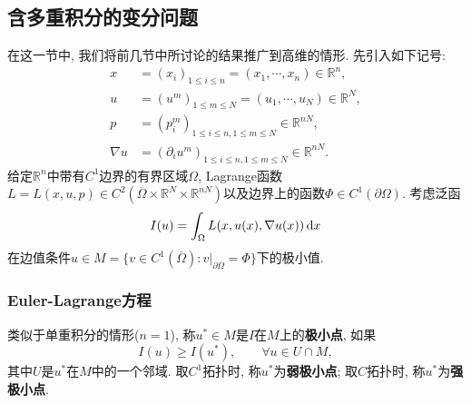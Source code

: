 \subsection{含多重积分的变分问题}

在这一节中, 我们将前几节中所讨论的结果推广到高维的情形. 先引入如下记号:
\begin{align*}
    x &= (x_i)_{1 \leq i \leq n} = (x_1, \cdots, x_n) \in \mathbb{R}^n, \\  
    u &= (u^m)_{1 \leq m \leq N} = (u_1, \cdots, u_N) \in \mathbb{R}^N, \\  
    p &= (p_i^m)_{1 \leq i \leq n, 1 \leq m \leq N} \in \mathbb{R}^{nN}, \\  
    \nabla u &= (\partial_iu^m)_{1 \leq i \leq n, 1 \leq m \leq N} \in \mathbb{R}^{nN}.
\end{align*}
给定$\mathbb{R}^n$中带有$C^1$边界的有界区域$\Omega$, Lagrange函数$L = L(x, u, p) \in C^2(\overline{\Omega} \times \mathbb{R}^N \times \mathbb{R}^{nN})$以及边界上的函数$\Phi \in C^1(\partial\Omega)$.
考虑泛函
\begin{equation*}
    I(u) = \int_{\Omega} L(x, u(x), \nabla u(x)) \,{\rm d}x
\end{equation*}
在边值条件$u \in M = \{v \in C^1(\overline{\Omega})\colon v|_{\partial\Omega} = \Phi\}$下的极小值.

\subsubsection{Euler-Lagrange方程}

类似于单重积分的情形($n = 1$), 称$u^* \in M$是$I$在$M$上的\textbf{极小点}, 如果 
\begin{equation*}
    I(u) \geq I(u^*), \qquad \forall u \in U \cap M,
\end{equation*}
其中$U$是$u^*$在$M$中的一个邻域. 取$C^1$拓扑时, 称$u^*$为\textbf{弱极小点}; 取$C$拓扑时, 称$u^*$为\textbf{强极小点}.

